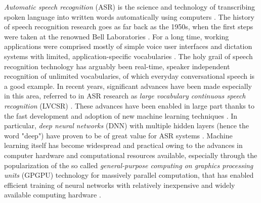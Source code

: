 \documentclass[english, 12pt, a4paper, pdftex, elec, utf8]{aaltothesis}
\begin{document}
\textit{Automatic speech recognition} (ASR) is the science and technology of transcribing spoken language into written words automatically using computers \cite{yu2014automatic, huang2001spoken}. The history of speech recognition research goes as far back as the 1950s, when the first steps were taken at the renowned Bell Laboratories \cite{gales2008application}. For a long time, working applications were comprised mostly of simple voice user interfaces and dictation systems with limited, application-specific vocabularies \cite{yu2014automatic, gales2008application}. The holy grail of speech recognition technology has arguably been real-time, speaker independent recognition of unlimited vocabularies, of which everyday conversational speech is a good example. In recent years, significant advances have been made especially in this area, referred to in ASR research as \textit{large vocabulary continuous speech recognition} (LVCSR) \cite{yu2014automatic, keronen2014approaching}. These advances have been enabled in large part thanks to the fast development and adoption of new machine learning techniques \cite{yu2014automatic, hinton2012deep}. In particular, \textit{deep neural networks} (DNN) with multiple hidden layers (hence the word "deep") have proven to be of great value for ASR systems \cite{yu2014automatic, hinton2012deep}. Machine learning itself has become widespread and practical owing to the advances in computer hardware and computational resources available, especially through the popularization of the so called \textit{general-purpose computing on graphics processing units} (GPGPU) technology for massively parallel computation, that has enabled efficient training of neural networks with relatively inexpensive and widely available computing hardware \cite{yu2014automatic, hinton2012deep}. \\\\
\end{document}
